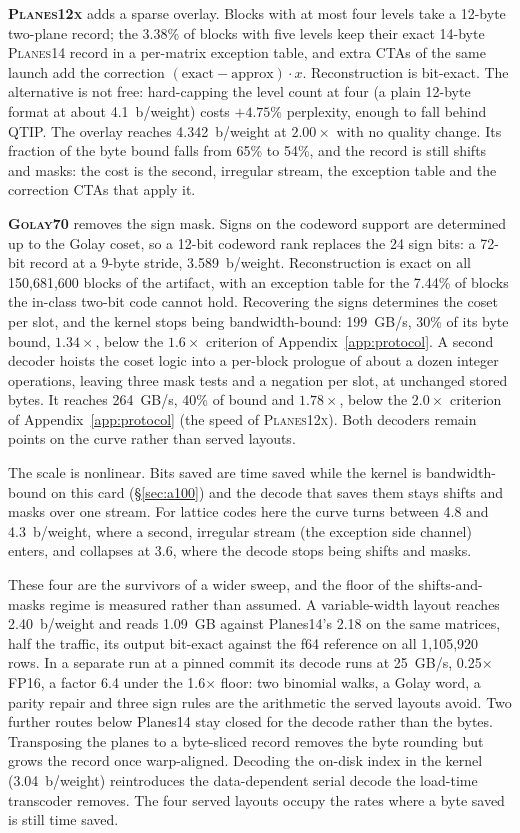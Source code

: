 \textbf{\textsc{Planes12x}} adds a sparse overlay. Blocks with at most four
levels take a 12-byte two-plane record; the 3.38\% of blocks with five
levels keep their exact 14-byte \textsc{Planes14} record in a per-matrix
exception table, and extra CTAs of the same launch add the correction
$(\mathrm{exact} - \mathrm{approx}) \cdot x$. Reconstruction is bit-exact.
The alternative is not free: hard-capping the level count at four (a plain
12-byte format at about 4.1~b/weight) costs $+4.75\%$ perplexity, enough
to fall behind QTIP. The overlay reaches 4.342~b/weight at $2.00\times$
with no quality change. Its fraction of the byte bound falls from 65\% to
54\%, and the record is still shifts and masks: the cost is the second,
irregular stream, the exception table and the correction CTAs that apply
it.

\textbf{\textsc{Golay70}} removes the sign mask. Signs on the codeword
support are determined up to the Golay coset, so a 12-bit codeword rank
replaces the 24 sign bits: a 72-bit record at a 9-byte stride,
3.589~b/weight. Reconstruction is exact on all 150{,}681{,}600 blocks of
the artifact, with an exception table for the 7.44\% of blocks the
in-class two-bit code cannot hold. Recovering the signs determines the
coset per slot, and the kernel stops being bandwidth-bound: 199~GB/s, 30\% of
its byte bound, $1.34\times$, below the $1.6\times$ criterion of
Appendix~\ref{app:protocol}. A second decoder hoists the coset logic into a
per-block prologue of about a dozen integer operations, leaving three mask
tests and a negation per slot, at unchanged stored bytes. It reaches
264~GB/s, 40\% of bound and $1.78\times$, below the $2.0\times$ criterion
of Appendix~\ref{app:protocol} (the speed of \textsc{Planes12x}). Both
decoders remain points on the curve rather than served layouts.

The scale is nonlinear. Bits saved are time saved while the kernel is
bandwidth-bound on this card (\S\ref{sec:a100}) and the decode that saves
them stays shifts and masks over one stream.
For lattice codes here the curve turns between 4.8 and 4.3~b/weight, where
a second, irregular stream (the exception side channel) enters, and
collapses at 3.6, where the decode stops being shifts and masks.

These four are the survivors of a wider sweep, and the floor of the
shifts-and-masks regime is measured rather than assumed. A variable-width
layout reaches 2.40~b/weight and reads 1.09~GB against Planes14's 2.18 on
the same matrices, half the traffic, its output bit-exact against the f64
reference on all 1{,}105{,}920 rows. In a separate run at a pinned commit
its decode runs at 25~GB/s, 0.25$\times$ FP16, a factor 6.4 under the
1.6$\times$ floor: two binomial walks, a Golay word, a parity repair and
three sign rules are the arithmetic the served layouts avoid. Two further
routes below Planes14 stay closed for the decode rather than the bytes.
Transposing the planes to a byte-sliced record removes the byte rounding
but grows the record once warp-aligned. Decoding the on-disk index in the
kernel (3.04~b/weight) reintroduces the data-dependent serial decode the
load-time transcoder removes. The four served layouts occupy the rates
where a byte saved is still time saved.

